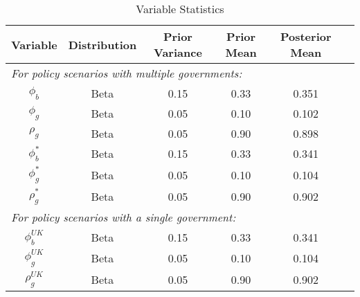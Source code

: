 \begin{table}[H]
    \centering
    \label{tab:priors_and_posteriors}
    \begin{tabular}{cccccc}
        \textbf{Variable} & \textbf{Distribution} & \textbf{Prior Variance} & \textbf{Prior Mean} & \textbf{Posterior Mean} \\
        \hline
        \multicolumn{5}{l}{\textit{For policy scenarios with multiple governments:}} \\
        $\phi_b$ & Beta & 0.15 & 0.33 & 0.351\\
        $\phi_g$ & Beta & 0.05 & 0.10 & 0.102\\
        $\rho_g$ & Beta & 0.05 & 0.90 & 0.898\\
        $\phi_b^*$ & Beta & 0.15 & 0.33 & 0.341\\
        $\phi_g^*$ & Beta & 0.05 & 0.10 & 0.104\\
        $\rho_g^*$ & Beta & 0.05 & 0.90 & 0.902\\
        \multicolumn{5}{l}{\textit{For policy scenarios with a single government:}} \\
        $\phi_b^{UK}$ & Beta & 0.15 & 0.33 & 0.341\\
        $\phi_g^{UK}$ & Beta & 0.05 & 0.10 & 0.104\\
        $\rho_g^{UK}$ & Beta & 0.05 & 0.90 & 0.902\\
    \end{tabular}
    \caption{Variable Statistics}
\end{table}
